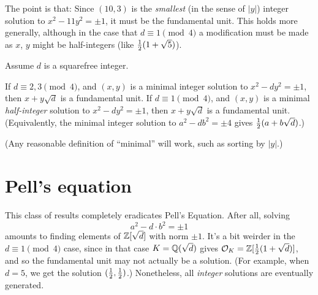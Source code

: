 The point is that: Since $(10,3)$ is the \emph{smallest}
(in the sense of $\left\lvert y \right\rvert$)
integer solution to $x^2-11y^2 = \pm 1$, it must be the fundamental unit.
This holds more generally, although in the case that $d \equiv 1 \pmod 4$
a modification must be made as $x$, $y$ might be half-integers (like $\frac{1}{2}(1+\sqrt5)$).
\begin{theorem}
	Assume $d$ is a squarefree integer.
	\begin{enumerate}[(a)]
		\ii If $d \equiv 2,3 \pmod 4$,
		and $(x,y)$ is a minimal integer solution to $x^2-dy^2 = \pm 1$,
		then $x + y \sqrt d$ is a fundamental unit.
		\ii If $d \equiv 1 \pmod 4$,
		and $(x,y)$ is a minimal \emph{half-integer} solution to $x^2-dy^2 = \pm 1$,
		then $x + y \sqrt d$ is a fundamental unit.
		(Equivalently, the minimal integer solution to $a^2 - db^2 = \pm 4$
		gives $\frac{1}{2} (a + b \sqrt d)$.)
	\end{enumerate}
	(Any reasonable definition of ``minimal'' will work, such as sorting by $\left\lvert y \right\rvert$.)
\end{theorem}

\section{Pell's equation}
This class of results completely eradicates Pell's Equation.
After all, solving
\[ a^2 - d \cdot b^2 = \pm 1 \]
amounts to finding elements of $\mathbb Z[\sqrt d]$ with norm $\pm 1$.
It's a bit weirder in the $d \equiv 1 \pmod 4$ case, since in that case $K = \mathbb Q(\sqrt d)$
gives $\mathcal O_K = \mathbb Z[\frac{1}{2}(1+\sqrt d)]$, and so the fundamental unit may not actually be a solution.
(For example, when $d = 5$, we get the solution $(\frac{1}{2}, \frac{1}{2})$.)
Nonetheless, all \emph{integer} solutions are eventually generated.

